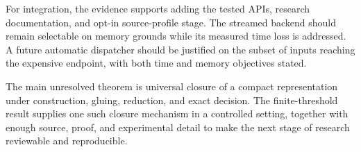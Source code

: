 For integration, the evidence supports adding the tested APIs, research
documentation, and opt-in source-profile stage. The streamed backend
should remain selectable on memory grounds while its measured time
loss is addressed. A future automatic dispatcher should be justified
on the subset of inputs reaching the expensive endpoint, with both
time and memory objectives stated.

The main unresolved theorem is universal closure of a compact
representation under construction, gluing, reduction, and exact
decision. The finite-threshold result supplies one such closure
mechanism in a controlled setting, together with enough source,
proof, and experimental detail to make the next stage of research
reviewable and reproducible.
